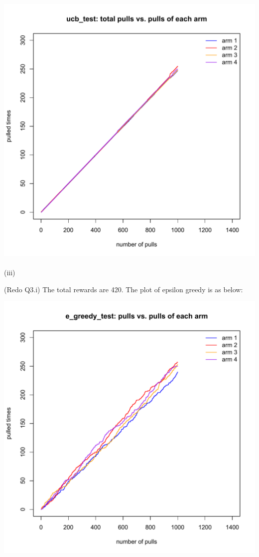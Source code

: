 \documentclass{article}
\begin{document}
\includegraphics[width=1.0\textwidth]{Q3_2.pdf} 
\\\\
(iii) 
\par
\quad (Redo Q3.i) The total rewards are 420. The plot of epsilon greedy is as below: \par
\includegraphics[width=1.0\textwidth]{Q3_3_1.pdf} 
\end{document}
